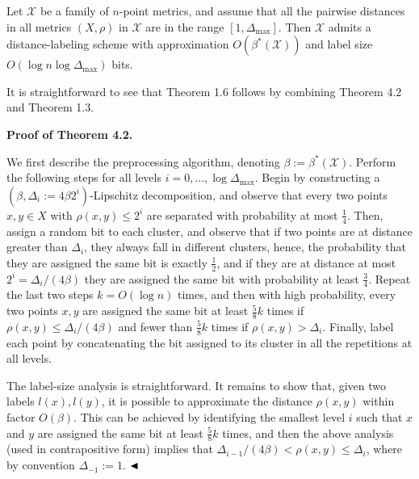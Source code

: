 \documentclass[10pt,a4paper]{amsart}
\begin{document}
Let $\mathcal{X}$ be a family of $n$-point metrics, and assume that all the pairwise distances in all metrics $(X,\rho)$ in $\mathcal{X}$ are in the range $[1,\Delta_{\text{max}}]$. Then $\mathcal{X}$ admits a distance-labeling scheme with approximation $O(\beta^{*}(\mathcal{X}))$ and label size $O(\log n\log\Delta_{\max})$ bits.
\par
\par
\par
It is straightforward to see that Theorem 1.6 follows by combining Theorem 4.2 and Theorem 1.3.
\par
\par
\par\medskip\noindent\textbf{Proof of Theorem 4.2.}\par
We first describe the preprocessing algorithm, denoting $\beta:=\beta^{*}(\mathcal{X})$. Perform the following steps for all levels $i=0,\ldots,\log{\Delta_{\text{max}}}$. Begin by constructing a $(\beta,\Delta_{i}:=4\beta 2^{i})$-Lipschitz decomposition, and observe that every two points $x,y\in X$ with $\rho(x,y)\leq 2^{i}$ are separated with probability at most $\frac{1}{4}$. Then, assign a random bit to each cluster, and observe that if two points are at distance greater than $\Delta_{i}$, they always fall in different clusters, hence, the probability that they are assigned the same bit is exactly $\frac{1}{2}$, and if they are at distance at most $2^{i}=\Delta_{i}/(4\beta)$ they are assigned the same bit with probability at least $\frac{3}{4}$. Repeat the last two steps $k=O(\log{n})$ times, and then with high probability, every two points $x,y$ are assigned the same bit at least $\frac{5}{8}k$ times if $\rho(x,y)\leq\Delta_{i}/(4\beta)$ and fewer than $\frac{5}{8}k$ times if $\rho(x,y)>\Delta_{i}$. Finally, label each point by concatenating the bit assigned to its cluster in all the repetitions at all levels.
\par
\par
The label-size analysis is straightforward. It remains to show that, given two labels $l(x),l(y)$, it is possible to approximate the distance $\rho(x,y)$ within factor $O(\beta)$. This can be achieved by identifying the smallest level $i$ such that $x$ and $y$ are assigned the same bit at least $\frac{5}{8}k$ times, and then the above analysis (used in contrapositive form) implies that $\Delta_{i-1}/(4\beta)<\rho(x,y)\leq\Delta_{i}$, where by convention $\Delta_{-1}:=1$. $\hfill\blacktriangleleft$
\par
\end{document}
